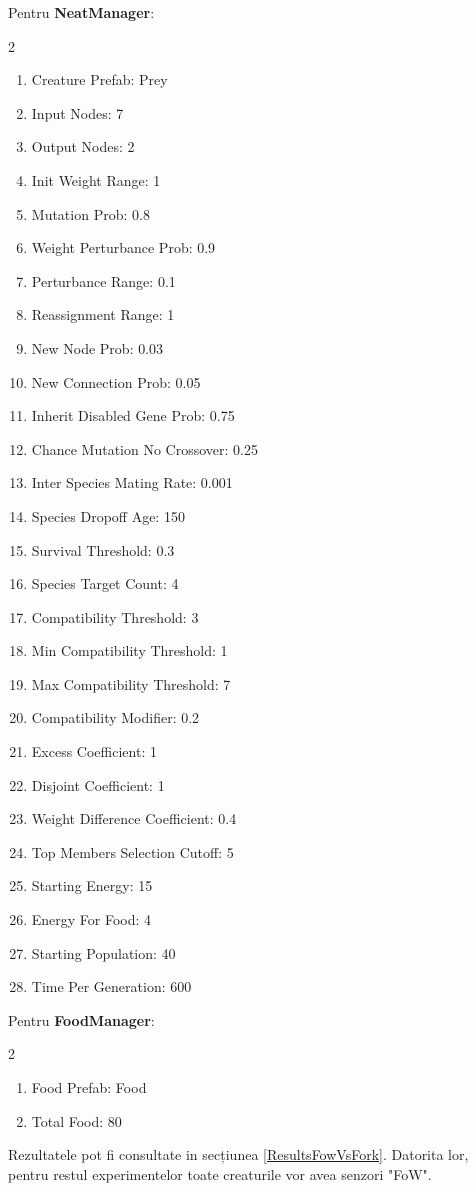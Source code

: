 Pentru \textbf{NeatManager}:
\begin{multicols}{2}
    \begin{enumerate}
        \item Creature Prefab: Prey
        \item Input Nodes: 7
        \item Output Nodes: 2
        \item Init Weight Range: 1
        \item Mutation Prob: 0.8
        \item Weight Perturbance Prob: 0.9
        \item Perturbance Range: 0.1
        \item Reassignment Range: 1
        \item New Node Prob: 0.03
        \item New Connection Prob: 0.05
        \item Inherit Disabled Gene Prob: 0.75
        \item Chance Mutation No Crossover: 0.25
        \item Inter Species Mating Rate: 0.001
        \item Species Dropoff Age: 150
        \item Survival Threshold: 0.3
        \item Species Target Count: 4
        \item Compatibility Threshold: 3
        \item Min Compatibility Threshold: 1
        \item Max Compatibility Threshold: 7
        \item Compatibility Modifier: 0.2
        \item Excess Coefficient: 1
        \item Disjoint Coefficient: 1
        \item Weight Difference Coefficient: 0.4
        \item Top Members Selection Cutoff: 5
        \item Starting Energy: 15
        \item Energy For Food: 4
        \item Starting Population: 40
        \item Time Per Generation: 600
    \end{enumerate}
\end{multicols}
Pentru \textbf{FoodManager}:
\begin{multicols}{2}
    \begin{enumerate}
        \item Food Prefab: Food
        \item Total Food: 80
    \end{enumerate}
\end{multicols}
Rezultatele pot fi consultate in secțiunea \ref{ResultsFowVsFork}. Datorita lor, pentru restul experimentelor toate creaturile vor avea senzori "FoW".

